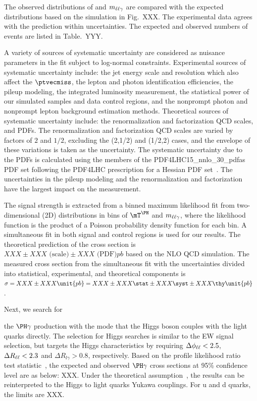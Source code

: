 The observed distributions of \mTH and $m_{\ell\ell\gamma}$ are compared with the expected distributions based on the \MGvATNLO simulation in Fig.~XXX. The experimental data agrees with the prediction within uncertainties. The expected and observed numbers of events are listed in Table.~YYY.

A variety of sources of systematic uncertainty are considered as nuisance parameters in the fit subject to log-normal constraints. Experimental sources of systematic uncertainty include: the jet energy scale and resolution which also affect the $\ptvecmiss$, the lepton and photon identification efficiencies, the pileup modeling, the integrated luminosity measurement, the statistical power of our simulated samples and data control regions, and the nonprompt photon and nonprompt lepton background estimation methods. Theoretical sources of systematic uncertainty include: the renormalization and factorization QCD scales, and PDFs. The renormalization and factorization QCD scales are varied by factors of $2$ and $1/2$, excluding the (2,1/2) and (1/2,2) cases, and the envelope of these variations is taken as the uncertainty. The systematic uncertainty due to the PDFs is calculated using the members of the PDF4LHC15\_nnlo\_30\_pdfas PDF set following the PDF4LHC prescription for a Hessian PDF set~\cite{Butterworth_2016,Harland_Lang_2015,Ball_2015,PhysRevD.93.033006}. The uncertainties in the pileup modeling and the renormalization and factorization have the largest impact on the measurement.

The signal strength is extracted from a binned maximum likelihood fit from two-dimensional (2D) distributions in bins of $\mTH$ and $m_{\ell\ell\gamma}$, where the likelihood function is the product of a Poisson probability density function for each bin. A simultaneous fit in both signal and control regions is used for our results. The theoretical prediction of the cross section is $XXX \pm XXX \text{ (scale)} \pm XXX \text{ (PDF)} \unit{pb}$ based on the NLO QCD \MGvATNLO simulation. The measured cross section from the simultaneous fit with the uncertainties divided into statistical, experimental, and theoretical components is $\sigma = XXX \pm XXX \unit{pb} =XXX \pm XXX \stat \pm XXX \syst \pm XXX \thy \unit{pb}$. 

Next, we search for 

the $\PH\gamma$ production with the mode that the Higgs boson couples with the light quarks directly. The selection for Higgs searches is similar to the EW signal selection, but targets the Higgs characteristics by requiring $\Delta\phi_{\ell\ell}<2.5$, $\Delta R_{\ell\ell}<2.3$ and $\Delta R_{l\gamma} >0.8$, respectively. Based on the profile likelihood ratio test statistic~\cite{CMS-NOTE-2011-005}, the expected and observed $\PH\gamma$ cross sections at 95\% confidence level are as below: XXX. Under the theoretical assumption~\cite{}, the results can be reinterpreted to the Higgs to light quarks Yukawa couplings. For u and d quarks, the limits are XXX.


